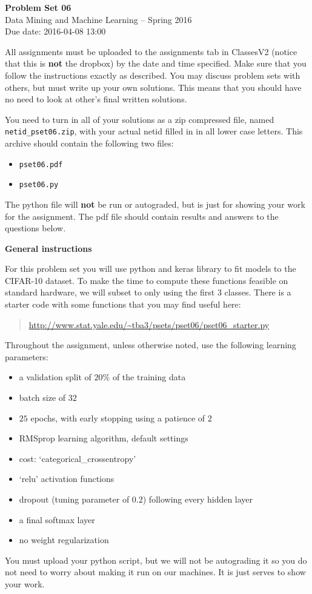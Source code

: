 \documentclass[12pt]{article}
\begin{document}
\begin{center}
{\bf Problem Set 06} \\
Data Mining and Machine Learning -- Spring 2016 \\
Due date: 2016-04-08 13:00
\end{center}

\medskip

All assignments must be uploaded to the assignments tab in ClassesV2
(notice that this is \textbf{not} the dropbox) by the date and time specified.
Make sure that you follow the instructions exactly as described.
You may discuss problem sets with others, but must write up your own
solutions. This means that you should have no need to look at other's
final written solutions.

You need to turn in all of your solutions as a zip compressed file, named
\texttt{netid\_pset06.zip}, with your actual netid filled in in all lower
case letters. This archive should contain the following two files:
\begin{itemize}
\item \texttt{pset06.pdf}
\item \texttt{pset06.py}
\end{itemize}
The python file will \textbf{not} be run or autograded, but is just for
showing your work for the assignment. The pdf file should contain results and
answers to the questions below.

\medskip

\textbf{General instructions}

For this problem set you will use python and keras library to fit models
to the CIFAR-10 dataset. To make the time to compute these functions feasible
on standard hardware, we will subset to only using the first 3 classes.
There is a starter code with some functions that you may find useful here:
\begin{quote}
\url{http://www.stat.yale.edu/~tba3/psets/pset06/pset06_starter.py}
\end{quote}
Throughout the assignment, unless otherwise noted, use the following
learning parameters:
\begin{itemize}
\item a validation split of $20\%$ of the training data
\item batch size of $32$
\item $25$ epochs, with early stopping using a patience of $2$
\item RMSprop learning algorithm, default settings
\item cost: `categorical\_crossentropy'
\item `relu' activation functions
\item dropout (tuning parameter of $0.2$) following every hidden layer
\item a final softmax layer
\item no weight regularization
\end{itemize}
You must upload your python script, but we will not be autograding it so
you do not need to worry about making it run on our machines. It is just
serves to show your work.
\end{document}
